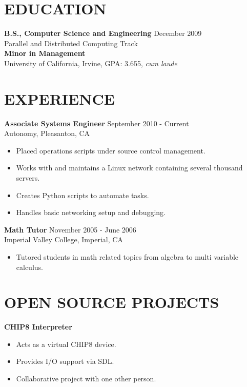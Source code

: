 \documentclass[10pt,line,margin]{res}
\begin{document}
\address{4245 Stanley Blvd. Apt. 6, Pleasanton, CA}
\address{jobs@apeschel.fastmail.fm or (760)-791-7301}

\begin{resume}
\vfill
\section{EDUCATION}
    {\bf B.S., Computer Science and Engineering} \hfill December 2009 \\
    Parallel and Distributed Computing Track \\
    {\bf Minor in Management} \\
    University of California, Irvine, GPA: 3.655, \textit{cum laude}

\section{EXPERIENCE}
    {\bf Associate Systems Engineer} \hfill September 2010 - Current \\
    Autonomy, Pleasanton, CA
    \begin{itemize} \itemsep -2pt
    \item Placed operations scripts under source control management.
    \item Works with and maintains a Linux network containing several thousand servers.
    \item Creates Python scripts to automate tasks.
    \item Handles basic networking setup and debugging.
    \end{itemize}

    {\bf Math Tutor} \hfill November 2005 - June 2006 \\
    Imperial Valley College, Imperial, CA
    \begin{itemize} \itemsep -2pt
    \item Tutored students in math related topics from
    algebra to multi variable calculus.
    \end{itemize}

\section {OPEN SOURCE PROJECTS}

    {\bf CHIP8 Interpreter}
    \begin{itemize} \itemsep -2pt
    \item Acts as a virtual CHIP8 device.
    \item Provides I/O support via SDL.
    \item Collaborative project with one other person.
    \end{itemize}


\end{resume}
\end{document}
